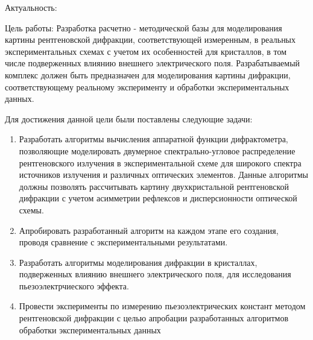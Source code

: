 
Актуальность:

Цель работы:
  Разработка расчетно - методической базы для моделирования картины рентгеновской
  дифракции, соответствующей измеренным, в реальных экспериментальных схемах
  с учетом их особенностей для кристаллов, в том числе подверженных влиянию
  внешнего электрического поля. Разрабатываемый комплекс должен быть предназначен
  для моделирования картины дифракции, соответствующему реальному эксперименту
  и обработки экспериментальных данных.

Для достижения данной цели были поставлены следующие задачи:
\begin{enumerate}
\item Разработать алгоритмы вычисления аппаратной функции дифрактометра, позволяющие моделировать
двумерное спектрально-угловое распределение рентгеновского излучения в экспериментальной схеме
для широкого спектра источников излучения и различных оптических элементов.
Данные алгоритмы должны позволять рассчитывать картину двухкристальной рентгеновской дифракции с учетом
асимметрии рефлексов и дисперсионности оптической схемы.

\item Апробировать разработанный алгоритм на каждом этапе его создания,
проводя сравнение с экспериментальными результатами.

\item  Разработать алгоритмы моделирования дифракции в кристаллах, подверженных
влиянию внешнего электрического поля, для исследования пьезоэлектрчиеского эффекта.

\item Провести эксперименты по измерению пьезоэлектрических констант
методом рентгеновской дифракции с целью апробации разработанных алгоритмов
обработки экспериментальных данных
\end{enumerate}

%
